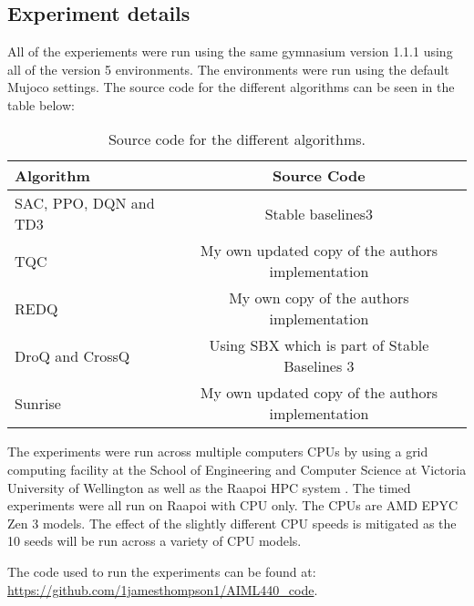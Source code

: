 \chapter{}\label{C:appendixA}

\section{Experiment details}

All of the experiements were run using the same gymnasium version 1.1.1 using all of the version 5 environments. The environments were run using the default Mujoco settings. The source code for the different algorithms can be seen in the table below:

\begin{table}[H]
\centering
\caption{Source code for the different algorithms.}
\label{tab:sourcecode}
\begin{tabular}{l|c}
\toprule
\textbf{Algorithm}                & \textbf{Source Code}             \\
\midrule\midrule
SAC, PPO, DQN and TD3 & Stable baselines3 \cite{stable-baselines3} \\

TQC & My own updated copy of the authors implementation \cite{thompson1jamesthompson1Tqc_pytorch2025} \cite{SamsungLabsTqc_pytorchImplementation} \\
REDQ & My own copy of the authors implementation \cite{thompson1jamesthompson1REDQ2025} \cite{watchernyuWatchernyuREDQ2025} \\
DroQ and CrossQ & Using SBX which is part of Stable Baselines 3 \cite{stable-baselines3} \\
Sunrise & My own updated copy of the authors implementation \cite{thompson1jamesthompson1Sunrise2025} \cite{leePokaxpokaSunrise2025} \\
\bottomrule
\end{tabular}
\end{table}

The experiments were run across multiple computers CPUs by using a grid computing facility at the School of Engineering and Computer Science at Victoria University of Wellington as well as the Raapoi HPC system \cite{RapoiClusterDocumentation}. The timed experiments were all run on Raapoi with CPU only. The CPUs are AMD EPYC Zen 3 models. The effect of the slightly different CPU speeds is mitigated as the 10 seeds will be run across a variety of CPU models.

The code used to run the experiments can be found at: \url{https://github.com/1jamesthompson1/AIML440_code}.

